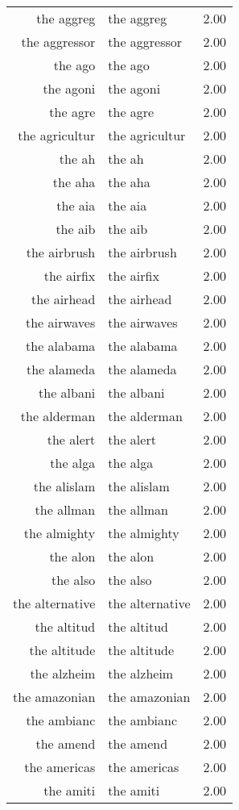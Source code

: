 \begin{table}[ht]
\begin{tabular}{rlr}
  the aggreg & the aggreg & 2.00 \\ 
  the aggressor & the aggressor & 2.00 \\ 
  the ago & the ago & 2.00 \\ 
  the agoni & the agoni & 2.00 \\ 
  the agre & the agre & 2.00 \\ 
  the agricultur & the agricultur & 2.00 \\ 
  the ah & the ah & 2.00 \\ 
  the aha & the aha & 2.00 \\ 
  the aia & the aia & 2.00 \\ 
  the aib & the aib & 2.00 \\ 
  the airbrush & the airbrush & 2.00 \\ 
  the airfix & the airfix & 2.00 \\ 
  the airhead & the airhead & 2.00 \\ 
  the airwaves & the airwaves & 2.00 \\ 
  the alabama & the alabama & 2.00 \\ 
  the alameda & the alameda & 2.00 \\ 
  the albani & the albani & 2.00 \\ 
  the alderman & the alderman & 2.00 \\ 
  the alert & the alert & 2.00 \\ 
  the alga & the alga & 2.00 \\ 
  the alislam & the alislam & 2.00 \\ 
  the allman & the allman & 2.00 \\ 
  the almighty & the almighty & 2.00 \\ 
  the alon & the alon & 2.00 \\ 
  the also & the also & 2.00 \\ 
  the alternative & the alternative & 2.00 \\ 
  the altitud & the altitud & 2.00 \\ 
  the altitude & the altitude & 2.00 \\ 
  the alzheim & the alzheim & 2.00 \\ 
  the amazonian & the amazonian & 2.00 \\ 
  the ambianc & the ambianc & 2.00 \\ 
  the amend & the amend & 2.00 \\ 
  the americas & the americas & 2.00 \\ 
  the amiti & the amiti & 2.00 \\ 

\end{tabular}
\end{table}

